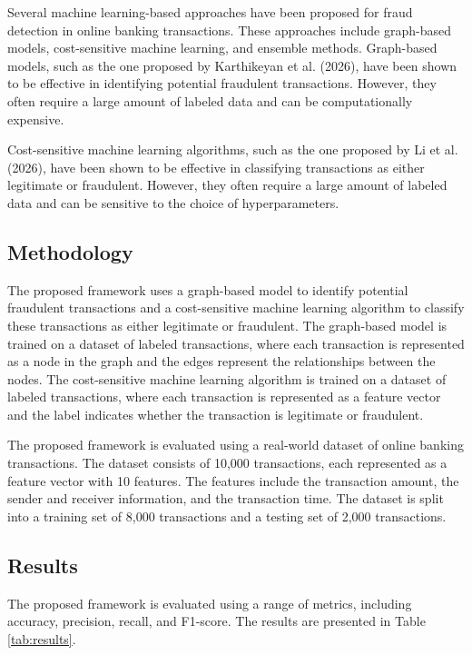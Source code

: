 \documentclass{article}
\begin{document}
        Several machine learning-based approaches have been proposed for fraud detection in online banking transactions. These approaches include graph-based models, cost-sensitive machine learning, and ensemble methods. Graph-based models, such as the one proposed by Karthikeyan et al. (2026), have been shown to be effective in identifying potential fraudulent transactions. However, they often require a large amount of labeled data and can be computationally expensive.

        Cost-sensitive machine learning algorithms, such as the one proposed by Li et al. (2026), have been shown to be effective in classifying transactions as either legitimate or fraudulent. However, they often require a large amount of labeled data and can be sensitive to the choice of hyperparameters.

        \subsection{Methodology}

        The proposed framework uses a graph-based model to identify potential fraudulent transactions and a cost-sensitive machine learning algorithm to classify these transactions as either legitimate or fraudulent. The graph-based model is trained on a dataset of labeled transactions, where each transaction is represented as a node in the graph and the edges represent the relationships between the nodes. The cost-sensitive machine learning algorithm is trained on a dataset of labeled transactions, where each transaction is represented as a feature vector and the label indicates whether the transaction is legitimate or fraudulent.

        The proposed framework is evaluated using a real-world dataset of online banking transactions. The dataset consists of 10,000 transactions, each represented as a feature vector with 10 features. The features include the transaction amount, the sender and receiver information, and the transaction time. The dataset is split into a training set of 8,000 transactions and a testing set of 2,000 transactions.

        \subsection{Results}

        The proposed framework is evaluated using a range of metrics, including accuracy, precision, recall, and F1-score. The results are presented in Table \ref{tab:results}.
\end{document}
